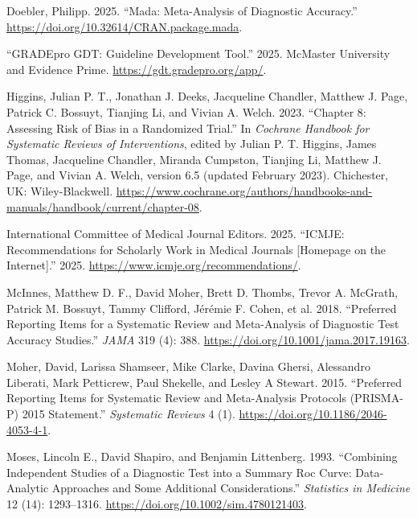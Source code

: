\documentclass[
  11pt,
  a4paper,
  DIV=11,
  numbers=noendperiod]{scrreprt}
\newlength{\cslhangindent}
\newenvironment{CSLReferences}[2] %
 {\begin{list}{}{%
  \setlength{\itemindent}{0pt}
  \setlength{\leftmargin}{0pt}
  \setlength{\parsep}{0pt}
  \ifodd #1
   \setlength{\leftmargin}{\cslhangindent}
   \setlength{\itemindent}{-1\cslhangindent}
  \fi
  \setlength{\itemsep}{#2\baselineskip}}}
 {\end{list}}
\begin{document}
\label{refs}
\begin{CSLReferences}{1}{0}
Doebler, Philipp. 2025. {``Mada: Meta-Analysis of Diagnostic
Accuracy.''} \url{https://doi.org/10.32614/CRAN.package.mada}.

{``GRADEpro GDT: Guideline Development Tool.''} 2025. {McMaster
University and Evidence Prime}. \url{https://gdt.gradepro.org/app/}.

Higgins, Julian P. T., Jonathan J. Deeks, Jacqueline Chandler, Matthew
J. Page, Patrick C. Bossuyt, Tianjing Li, and Vivian A. Welch. 2023.
{``Chapter 8: Assessing Risk of Bias in a Randomized Trial.''} In
\emph{Cochrane Handbook for Systematic Reviews of Interventions}, edited
by Julian P. T. Higgins, James Thomas, Jacqueline Chandler, Miranda
Cumpston, Tianjing Li, Matthew J. Page, and Vivian A. Welch, version 6.5
(updated February 2023). Chichester, UK: Wiley-Blackwell.
\url{https://www.cochrane.org/authors/handbooks-and-manuals/handbook/current/chapter-08}.

International Committee of Medical Journal Editors. 2025. {``ICMJE:
Recommendations for Scholarly Work in Medical Journals {[}Homepage on
the Internet{]}.''} 2025. \url{https://www.icmje.org/recommendations/}.

McInnes, Matthew D. F., David Moher, Brett D. Thombs, Trevor A. McGrath,
Patrick M. Bossuyt, Tammy Clifford, Jérémie F. Cohen, et al. 2018.
{``Preferred Reporting Items for a Systematic Review and Meta-Analysis
of Diagnostic Test Accuracy Studies.''} \emph{JAMA} 319 (4): 388.
\url{https://doi.org/10.1001/jama.2017.19163}.

Moher, David, Larissa Shamseer, Mike Clarke, Davina Ghersi, Alessandro
Liberati, Mark Petticrew, Paul Shekelle, and Lesley A Stewart. 2015.
{``Preferred Reporting Items for Systematic Review and Meta-Analysis
Protocols (PRISMA-P) 2015 Statement.''} \emph{Systematic Reviews} 4 (1).
\url{https://doi.org/10.1186/2046-4053-4-1}.

Moses, Lincoln E., David Shapiro, and Benjamin Littenberg. 1993.
{``Combining Independent Studies of a Diagnostic Test into a Summary Roc
Curve: Data{-}Analytic Approaches and Some Additional Considerations.''}
\emph{Statistics in Medicine} 12 (14): 1293--1316.
\url{https://doi.org/10.1002/sim.4780121403}.


\end{CSLReferences}
\end{document}

